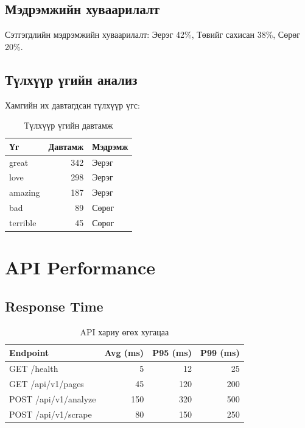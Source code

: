 \documentclass[12pt,a4paper]{report}
\begin{document}
\subsection{Мэдрэмжийн хуваарилалт}

Сэтгэгдлийн мэдрэмжийн хуваарилалт: Эерэг 42\%, Төвийг сахисан 38\%, Сөрөг 20\%.

\subsection{Түлхүүр үгийн анализ}

Хамгийн их давтагдсан түлхүүр үгс:

\begin{table}[H]
\centering
\caption{Түлхүүр үгийн давтамж}
\begin{tabular}{|l|r|l|}
\hline
\textbf{Үг} & \textbf{Давтамж} & \textbf{Мэдрэмж} \\
\hline
great & 342 & Эерэг \\
love & 298 & Эерэг \\
amazing & 187 & Эерэг \\
bad & 89 & Сөрөг \\
terrible & 45 & Сөрөг \\
\hline
\end{tabular}
\end{table}

\section{API Performance}

\subsection{Response Time}

\begin{table}[H]
\centering
\caption{API хариу өгөх хугацаа}
\begin{tabular}{|l|r|r|r|}
\hline
\textbf{Endpoint} & \textbf{Avg (ms)} & \textbf{P95 (ms)} & \textbf{P99 (ms)} \\
\hline
GET /health & 5 & 12 & 25 \\
GET /api/v1/pages & 45 & 120 & 200 \\
POST /api/v1/analyze & 150 & 320 & 500 \\
POST /api/v1/scrape & 80 & 150 & 250 \\
\hline
\end{tabular}
\end{table}
\end{document}
